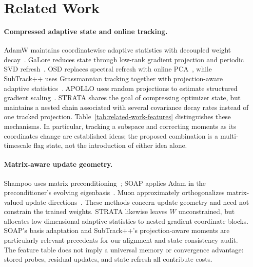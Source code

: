 \section{Related Work}
\label{sec:related-work}
\paragraph{Compressed adaptive state and online tracking.}
AdamW maintains coordinatewise adaptive statistics with decoupled weight decay~\cite{adamw2019}. GaLore reduces state through low-rank gradient projection and periodic SVD refresh~\cite{zhao2024galore}. OSD replaces spectral refresh with online PCA~\cite{liang2024osd}, while SubTrack++ uses Grassmannian tracking together with projection-aware adaptive statistics~\cite{rajabi2025subtrackpp}. APOLLO uses random projections to estimate structured gradient scaling~\cite{apollo2024}. STRATA shares the goal of compressing optimizer state, but maintains a nested chain associated with several covariance decay rates instead of one tracked projection. Table~\ref{tab:related-work-features} distinguishes these mechanisms. In particular, tracking a subspace and correcting moments as its coordinates change are established ideas; the proposed combination is a multi-timescale flag state, not the introduction of either idea alone.



\paragraph{Matrix-aware update geometry.}
Shampoo uses matrix preconditioning~\cite{gupta2018shampoo}; SOAP applies Adam in the preconditioner's evolving eigenbasis~\cite{vyas2024soap}. Muon approximately orthogonalizes matrix-valued update directions~\cite{jordan2024muon}. These methods concern update geometry and need not constrain the trained weights. STRATA likewise leaves $W$ unconstrained, but allocates low-dimensional adaptive statistics to nested gradient-coordinate blocks. SOAP's basis adaptation and SubTrack++'s projection-aware moments are particularly relevant precedents for our alignment and state-consistency audit. The feature table does not imply a universal memory or convergence advantage: stored probes, residual updates, and state refresh all contribute costs.

